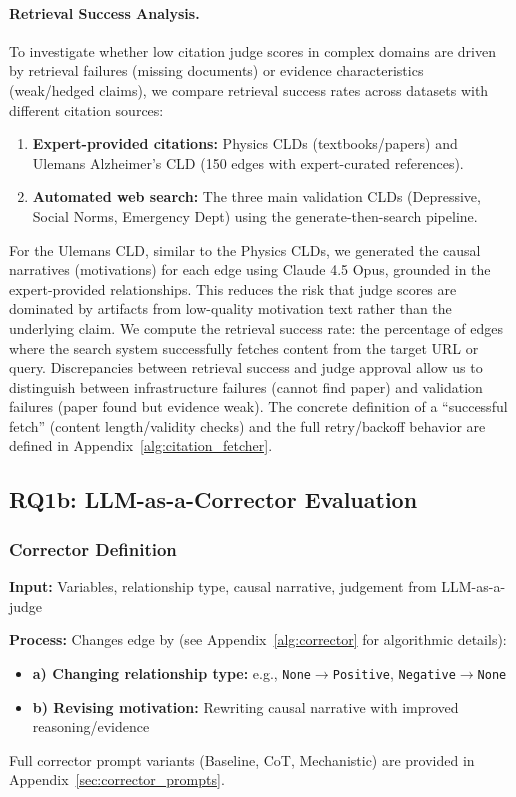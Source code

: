\paragraph{Retrieval Success Analysis.}
To investigate whether low citation judge scores in complex domains are driven by retrieval failures (missing documents) or evidence characteristics (weak/hedged claims), we compare retrieval success rates across datasets with different citation sources:
\begin{enumerate}[noitemsep]
    \item \textbf{Expert-provided citations:} Physics CLDs (textbooks/papers) and Ulemans Alzheimer's CLD (150 edges with expert-curated references).
    \item \textbf{Automated web search:} The three main validation CLDs (Depressive, Social Norms, Emergency Dept) using the generate-then-search pipeline.
\end{enumerate}
For the Ulemans CLD, similar to the Physics CLDs, we generated the causal narratives (motivations) for each edge using Claude 4.5 Opus, grounded in the expert-provided relationships. This reduces the risk that judge scores are dominated by artifacts from low-quality motivation text rather than the underlying claim.
We compute the retrieval success rate: the percentage of edges where the search system successfully fetches content from the target URL or query. Discrepancies between retrieval success and judge approval allow us to distinguish between infrastructure failures (cannot find paper) and validation failures (paper found but evidence weak).
The concrete definition of a “successful fetch” (content length/validity checks) and the full retry/backoff behavior are defined in Appendix~\ref{alg:citation_fetcher}.

\subsection{RQ1b: LLM-as-a-Corrector Evaluation}

\subsubsection{Corrector Definition}
\textbf{Input:} Variables, relationship type, causal narrative, judgement from LLM-as-a-judge

\textbf{Process:} Changes edge by (see Appendix~\ref{alg:corrector} for algorithmic details):
\begin{itemize}[noitemsep]
    \item \textbf{a) Changing relationship type:} e.g., \texttt{None}$\rightarrow$\texttt{Positive}, \texttt{Negative}$\rightarrow$\texttt{None}
    \item \textbf{b) Revising motivation:} Rewriting causal narrative with improved reasoning/evidence
\end{itemize}
Full corrector prompt variants (Baseline, CoT, Mechanistic) are provided in Appendix~\ref{sec:corrector_prompts}.

